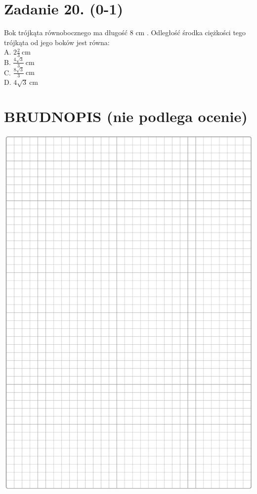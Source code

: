 \documentclass[10pt]{article}
\begin{document}
\section*{Zadanie 20. (0-1)}
Bok trójkąta równobocznego ma długość 8 cm . Odległość środka ciężkości tego trójkąta od jego boków jest równa:\\
A. \(2 \frac{2}{3} \mathrm{~cm}\)\\
B. \(\frac{4 \sqrt{3}}{3} \mathrm{~cm}\)\\
C. \(\frac{8 \sqrt{3}}{3} \mathrm{~cm}\)\\
D. \(4 \sqrt{3} \mathrm{~cm}\)

\section*{BRUDNOPIS (nie podlega ocenie)}
\begin{center}
\includegraphics[max width=\textwidth]{2024_11_21_e15da647cf0a41077ac3g-07}
\end{center}
\end{document}
